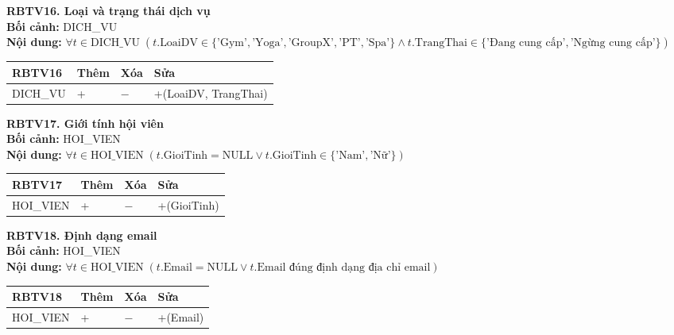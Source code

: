 \documentclass[11pt, a4paper]{article}
\begin{document}
\vspace{0.8em}
\textbf{RBTV16. Loại và trạng thái dịch vụ} \\
\textbf{Bối cảnh:} DICH\_VU \\
\textbf{Nội dung:} $\forall t \in \text{DICH\_VU} \; (t.\text{LoaiDV} \in \{\text{'Gym'}, \text{'Yoga'}, \text{'GroupX'}, \text{'PT'}, \text{'Spa'}\} \land t.\text{TrangThai} \in \{\text{'Đang cung cấp'}, \text{'Ngừng cung cấp'}\})$

\vspace{0.3em}
\begin{small}
\begin{tabularx}{\textwidth}{| C{4.2cm} | C{2cm} | C{2cm} | Y |}
\hline
\textbf{RBTV16} & \textbf{Thêm} & \textbf{Xóa} & \textbf{Sửa} \\
\hline
DICH\_VU & + & $-$ & +(LoaiDV, TrangThai) \\
\hline
\end{tabularx}
\end{small}

\vspace{0.8em}
\textbf{RBTV17. Giới tính hội viên} \\
\textbf{Bối cảnh:} HOI\_VIEN \\
\textbf{Nội dung:} $\forall t \in \text{HOI\_VIEN} \; (t.\text{GioiTinh} = \text{NULL} \lor t.\text{GioiTinh} \in \{\text{'Nam'}, \text{'Nữ'}\})$

\vspace{0.3em}
\begin{small}
\begin{tabularx}{\textwidth}{| C{4.2cm} | C{2cm} | C{2cm} | Y |}
\hline
\textbf{RBTV17} & \textbf{Thêm} & \textbf{Xóa} & \textbf{Sửa} \\
\hline
HOI\_VIEN & + & $-$ & +(GioiTinh) \\
\hline
\end{tabularx}
\end{small}

\vspace{0.8em}
\textbf{RBTV18. Định dạng email} \\
\textbf{Bối cảnh:} HOI\_VIEN \\
\textbf{Nội dung:} $\forall t \in \text{HOI\_VIEN} \; (t.\text{Email} = \text{NULL} \lor t.\text{Email đúng định dạng địa chỉ email})$

\vspace{0.3em}
\begin{small}
\begin{tabularx}{\textwidth}{| C{4.2cm} | C{2cm} | C{2cm} | Y |}
\hline
\textbf{RBTV18} & \textbf{Thêm} & \textbf{Xóa} & \textbf{Sửa} \\
\hline
HOI\_VIEN & + & $-$ & +(Email) \\
\hline
\end{tabularx}
\end{small}
\end{document}
